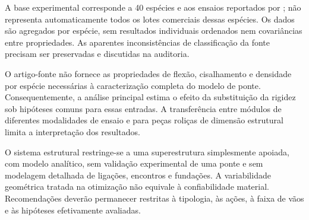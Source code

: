 A base experimental corresponde a 40 espécies e aos ensaios reportados por \textcite{DiasLahr2004}; não representa automaticamente todos os lotes comerciais dessas espécies. Os dados são agregados por espécie, sem resultados individuais ordenados nem covariâncias entre propriedades. As aparentes inconsistências de classificação da fonte precisam ser preservadas e discutidas na auditoria.

O artigo-fonte não fornece as propriedades de flexão, cisalhamento e densidade por espécie necessárias à caracterização completa do modelo de ponte. Consequentemente, a análise principal estima o efeito da substituição da rigidez sob hipóteses comuns para essas entradas. A transferência entre módulos de diferentes modalidades de ensaio e para peças roliças de dimensão estrutural limita a interpretação dos resultados.

O sistema estrutural restringe-se a uma superestrutura simplesmente apoiada, com modelo analítico, sem validação experimental de uma ponte e sem modelagem detalhada de ligações, encontros e fundações. A variabilidade geométrica tratada na otimização não equivale à confiabilidade material. Recomendações deverão permanecer restritas à tipologia, às ações, à faixa de vãos e às hipóteses efetivamente avaliadas.
